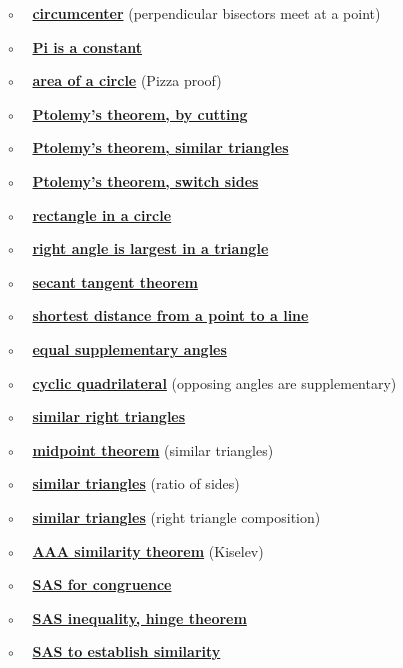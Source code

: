 \documentclass[11pt, oneside]{article}
\begin{document}
$\circ$ \ \ \hyperref[sec:circumcenter]{\textbf{circumcenter}} (perpendicular bisectors meet at a point)

$\circ$ \ \ \hyperref[sec:Pi_is_a_constant]{\textbf{Pi is a constant}}

$\circ$ \ \ \hyperref[sec:pizza_proof]{\textbf{area of a circle}} (Pizza proof)

$\circ$ \ \ \hyperref[sec:Ptolemy]{\textbf{Ptolemy's theorem, by cutting}}

$\circ$ \ \ \hyperref[sec:Ptolemy_similar_triangles]{\textbf{Ptolemy's theorem, similar triangles}}

$\circ$ \ \ \hyperref[sec:Ptolemy_switch_sides]{\textbf{Ptolemy's theorem, switch sides}}

$\circ$ \ \ \hyperref[sec:rectangle_side_on_a_circle]{\textbf{rectangle in a circle}}

$\circ$ \ \ \hyperref[sec:right_angle_largest]{\textbf{right angle is largest in a triangle}}

$\circ$ \ \ \hyperref[sec:secant_tangent_theorem]{\textbf{secant tangent theorem}}

$\circ$ \ \ \hyperref[sec:shortest_distance_to_line]{\textbf{shortest distance from a point to a line}}

$\circ$ \ \ \hyperref[sec:equal_supplementary_angles]{\textbf{equal supplementary angles}}

$\circ$ \ \ \hyperref[sec:quadrilateral_supplementary]{\textbf{cyclic quadrilateral}} (opposing angles are supplementary)

$\circ$ \ \ \hyperref[sec:similar_right_triangles]{\textbf{similar right triangles}}

$\circ$ \ \ \hyperref[sec:midpoint_theorem]{\textbf{midpoint theorem}} (similar triangles)

$\circ$ \ \  \hyperref[sec:similarity_equal_ratios]{\textbf{similar triangles}} (ratio of sides)

$\circ$ \ \  \hyperref[sec:similarity_right_to_all_triangles]{\textbf{similar triangles}} (right triangle composition)

$\circ$ \ \ \hyperref[sec:similarity_theorem]{\textbf{AAA similarity theorem}} (Kiselev)

$\circ$ \ \ \hyperref[sec:SAS]{\textbf{SAS for congruence}}

$\circ$ \ \ \hyperref[sec:hinge_theorem]{\textbf{SAS inequality, hinge theorem}}

$\circ$ \ \ \hyperref[sec:SAS_similar]{\textbf{SAS to establish similarity}}
\end{document}
